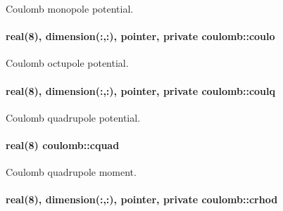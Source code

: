 Coulomb monopole potential. 

\paragraph[{\texorpdfstring{coulo}{coulo}}]{\setlength{\rightskip}{0pt plus 5cm}real(8), dimension(\+:,\+:), pointer, private coulomb\+::coulo\hspace{0.3cm}{\ttfamily [private]}}\hypertarget{namespacecoulomb_a0c3ad1d6aead6c0e5df604afc7f5b682}{}\label{namespacecoulomb_a0c3ad1d6aead6c0e5df604afc7f5b682}


Coulomb octupole potential. 

\paragraph[{\texorpdfstring{coulq}{coulq}}]{\setlength{\rightskip}{0pt plus 5cm}real(8), dimension(\+:,\+:), pointer, private coulomb\+::coulq\hspace{0.3cm}{\ttfamily [private]}}\hypertarget{namespacecoulomb_af61c3d4b51a718e10c0f3c8c61dfbc3b}{}\label{namespacecoulomb_af61c3d4b51a718e10c0f3c8c61dfbc3b}


Coulomb quadrupole potential. 

\paragraph[{\texorpdfstring{cquad}{cquad}}]{\setlength{\rightskip}{0pt plus 5cm}real(8) coulomb\+::cquad}\hypertarget{namespacecoulomb_a450353dd0725d0adcfccde340eaec3fd}{}\label{namespacecoulomb_a450353dd0725d0adcfccde340eaec3fd}


Coulomb quadrupole moment. 

\paragraph[{\texorpdfstring{crhod}{crhod}}]{\setlength{\rightskip}{0pt plus 5cm}real(8), dimension(\+:,\+:), pointer, private coulomb\+::crhod\hspace{0.3cm}{\ttfamily [private]}}\hypertarget{namespacecoulomb_aae489523d013394686a4eccecbd8e671}{}\label{namespacecoulomb_aae489523d013394686a4eccecbd8e671}


